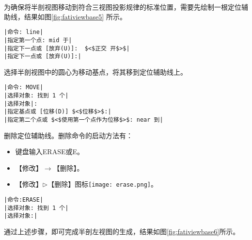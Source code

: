 \begin{procedure}
为确保将半剖视图移动到符合三视图投影规律的标准位置，需要先绘制一根定位辅助线，结果如图\ref{fig:fativiewbase5} 所示。
\begin{lstlisting}
|命令: line|
|指定第一个点: mid 于|
|指定下一点或 [放弃(U)]:  $<$正交 开$>$|
|指定下一点或 [放弃(U)]:|
\end{lstlisting}
\begin{figure}[htbp]
\centering
\begin{floatrow}[2]
\end{floatrow}
\end{figure}
选择半剖视图中的圆心为移动基点，将其移到定位辅助线上。
\begin{lstlisting}
|命令: MOVE|
|选择对象: 找到 1 个|
|选择对象|:
|指定基点或 [位移(D)] $<$位移$>$:|
|指定第二个点或 $<$使用第一个点作为位移$>$: near 到|
\end{lstlisting}
删除定位辅助线。删除命令的启动方法有：
\begin{itemize}
\item 键盘输入ERASE或E。
\item 【修改】$\rightarrow$【删除】。
\item 【修改】$\triangleright$【删除】图标\texttt{[image: erase.png]}。
\end{itemize}
\begin{lstlisting}
|命令:ERASE|
|选择对象: 找到 1 个|
|选择对象:|
\end{lstlisting}
\end{procedure}
通过上述步骤，即可完成半剖左视图的生成，结果如图\ref{fig:fativiewbase6}所示。
\endinput